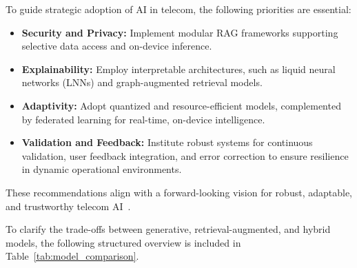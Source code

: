 \documentclass[sigconf]{acmart}
\begin{document}
To guide strategic adoption of AI in telecom, the following priorities are essential:
\begin{itemize}
    \item \textbf{Security and Privacy:} Implement modular RAG frameworks supporting selective data access and on-device inference.
    \item \textbf{Explainability:} Employ interpretable architectures, such as liquid neural networks (LNNs) and graph-augmented retrieval models.
    \item \textbf{Adaptivity:} Adopt quantized and resource-efficient models, complemented by federated learning for real-time, on-device intelligence.
    \item \textbf{Validation and Feedback:} Institute robust systems for continuous validation, user feedback integration, and error correction to ensure resilience in dynamic operational environments.
\end{itemize}
These recommendations align with a forward-looking vision for robust, adaptable, and trustworthy telecom AI~\cite{ref7, ref16, ref17, ref18, ref19, ref20, ref21, ref22, ref23, ref26, ref27, ref28, ref30}.

To clarify the trade-offs between generative, retrieval-augmented, and hybrid models, the following structured overview is included in Table~\ref{tab:model_comparison}.
\end{document}
